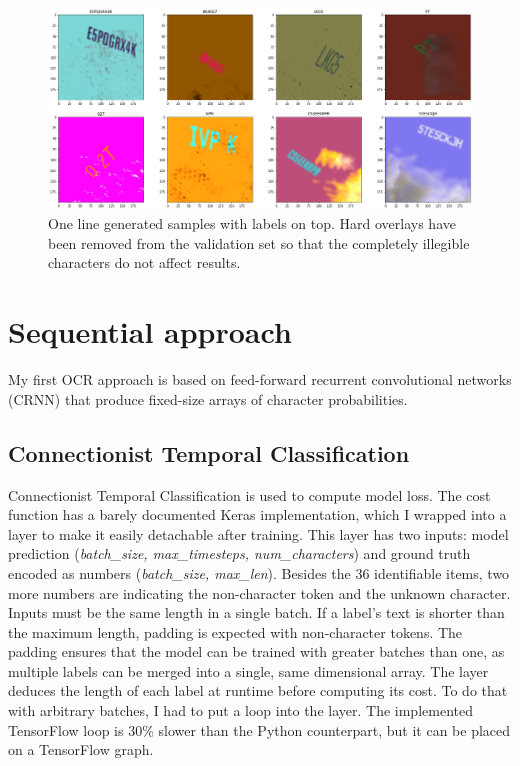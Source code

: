 \begin{figure}[htb]
 \centerline{\includegraphics[width=1.0\columnwidth]{.//Figure/OCR/generated.png}}
 \caption{One line generated samples with labels on top. Hard overlays have been removed from the validation set so that the completely illegible characters do not affect results.}
 \label{fig:generated}
\end{figure}

\section{Sequential approach}

My first OCR approach is based on feed-forward recurrent convolutional networks (CRNN) that produce fixed-size arrays of character probabilities.

\subsection{Connectionist Temporal Classification}

Connectionist Temporal Classification\cite{CTC} is used to compute model loss. The cost function has a barely documented Keras implementation, which I wrapped into a layer to make it easily detachable after training. This layer has two inputs: model prediction (\textit{batch\_size, max\_timesteps, num\_characters}) and ground truth encoded as numbers (\textit{batch\_size, max\_len}). Besides the 36 identifiable items, two more numbers are indicating the non-character token and the unknown character. Inputs must be the same length in a single batch. If a label's text is shorter than the maximum length, padding is expected with non-character tokens. The padding ensures that the model can be trained with greater batches than one, as multiple labels can be merged into a single, same dimensional array. The layer deduces the length of each label at runtime before computing its cost. To do that with arbitrary batches, I had to put a loop into the layer. The implemented TensorFlow loop is 30\% slower than the Python counterpart, but it can be placed on a TensorFlow graph.

